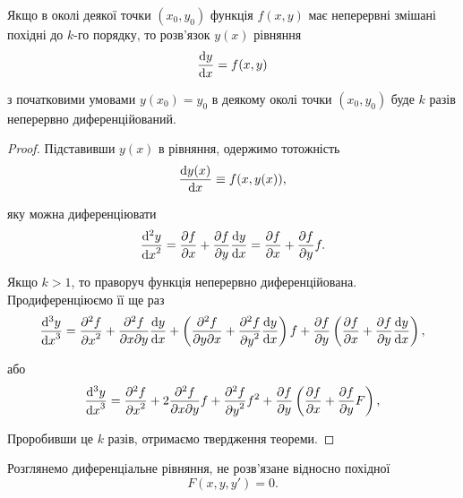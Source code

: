 \begin{theorem}
	Якщо в околі деякої точки $(x_0,y_0)$ функція $f(x,y)$ має неперервні змішані похідні до $k$-го порядку, то роз\-в'яз\-ок $y(x)$ рівняння
	\begin{equation*}
		\frac{\mathop{}\!\mathrm{d} y}{\mathop{}\!\mathrm{d} x} = f(x, y)
	\end{equation*}

	з початковими умовами $y(x_0)=y_0$ в деякому околі точки $(x_0,y_0)$ буде $k$ разів неперервно диференційований.
\end{theorem}

\begin{proof} 
	Підставивши $y(x)$ в рівняння, одержимо тотожність
	\begin{equation*}
		\frac{\mathop{}\!\mathrm{d} y(x)}{\mathop{}\!\mathrm{d} x} \equiv f(x, y(x)),
	\end{equation*}

	яку можна диференціювати
	\begin{equation*}
		\frac{\mathop{}\!\mathrm{d}^2 y}{{\mathop{}\!\mathrm{d} x}^2} = \frac{\partial f}{\partial x} + \frac{\partial f}{\partial y} \frac{\mathop{}\!\mathrm{d} y}{\mathop{}\!\mathrm{d} x} = \frac{\partial f}{\partial x} + \frac{\partial f}{\partial y} f.
	\end{equation*}

	Якщо $k > 1$, то праворуч функція неперервно диференційована. Продиференціюємо її ще раз
	\begin{equation*}
		\frac{\diff^3 y}{{\diff x}^3} = \frac{\partial^2 f}{{\partial x}^2} + \frac{\partial^2 f}{\partial x \partial y} \frac{\diff y}{\diff x} + \left( \frac{\partial^2 f}{\partial y \partial x} + \frac{\partial^2 f}{{\partial y}^2} \frac{\diff y}{\diff x} \right) f + \frac{\partial f}{\partial y} \left( \frac{\partial f}{\partial x} + \frac{\partial f}{\partial y} \frac{\diff y}{\diff x} \right),
	\end{equation*}

	або
	\begin{equation*}
		\frac{\mathop{}\!\mathrm{d}^3 y}{{\mathop{}\!\mathrm{d} x}^3} = \frac{\partial^2 f}{{\partial x}^2} + 2 \frac{\partial^2 f}{\partial x \partial y} f + \frac{\partial^2 f}{{\partial y}^2} f^2 + \frac{\partial f}{\partial y} \left( \frac{\partial f}{\partial x} + \frac{\partial f}{\partial y} F \right),
	\end{equation*}

	Проробивши це $k$ разів, отримаємо твердження теореми.
\end{proof}

Розглянемо диференціальне рівняння, не розв'язане відносно похідної
\begin{equation*}
	F(x, y, y') = 0.
\end{equation*}

